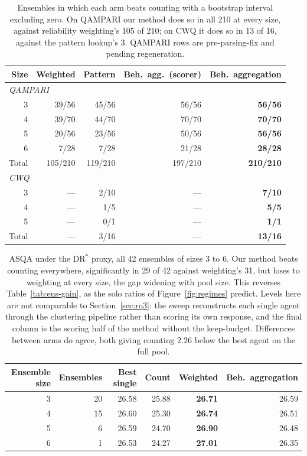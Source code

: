 \documentclass{article}
\begin{document}
\begin{table}[H]
  \caption{Ensembles in which each arm beats counting with a bootstrap interval excluding zero. On QAMPARI our method does so in all 210 at every size, against reliability weighting's 105 of 210; on CWQ it does so in 13 of 16, against the pattern lookup's 3. QAMPARI rows are pre-parsing-fix and pending regeneration.}
  \label{tab:ens-sig}
  \centering
  \begin{tabular}{rrrrr}
    \toprule
    Size & Weighted & Pattern & Beh.\ agg.\ (scorer) & Beh.\ aggregation \\
    \midrule
    \multicolumn{5}{l}{\emph{QAMPARI}} \\
    3 & 39/56 & 45/56 & 56/56 & \textbf{56/56} \\
    4 & 39/70 & 44/70 & 70/70 & \textbf{70/70} \\
    5 & 20/56 & 23/56 & 50/56 & \textbf{56/56} \\
    6 &  7/28 &  7/28 & 21/28 & \textbf{28/28} \\
    \midrule
    Total & 105/210 & 119/210 & 197/210 & \textbf{210/210} \\
    \midrule
    \multicolumn{5}{l}{\emph{CWQ}} \\
    3 & --- & 2/10 & --- & \textbf{7/10} \\
    4 & --- & 1/5  & --- & \textbf{5/5}  \\
    5 & --- & 0/1  & --- & \textbf{1/1}  \\
    \midrule
    Total & --- & 3/16 & --- & \textbf{13/16} \\
    \bottomrule
  \end{tabular}
\end{table}

\begin{table}[H]
  \caption{ASQA under the $\mathrm{DR}^*$ proxy, all 42 ensembles of sizes 3 to 6. Our method beats counting everywhere, significantly in 29 of 42 against weighting's 31, but loses to weighting at every size, the gap widening with pool size. This reverses Table~\ref{tab:ens-gain}, as the solo ratios of Figure~\ref{fig:regimes} predict. Levels here are not comparable to Section~\ref{sec:rq3}: the sweep reconstructs each single agent through the clustering pipeline rather than scoring its own response, and the final column is the scoring half of the method without the keep-budget. Differences between arms do agree, both giving counting $2.26$ below the best agent on the full pool.}
  \label{tab:asqa}
  \centering
  \begin{tabular}{rrrrrr}
    \toprule
    Ensemble size & Ensembles & Best single & Count & Weighted & Beh.\ aggregation \\
    \midrule
    3 & 20 & 26.58 & 25.88 & \textbf{26.71} & 26.59 \\
    4 & 15 & 26.60 & 25.30 & \textbf{26.74} & 26.51 \\
    5 &  6 & 26.59 & 24.70 & \textbf{26.90} & 26.48 \\
    6 &  1 & 26.53 & 24.27 & \textbf{27.01} & 26.35 \\
    \bottomrule
  \end{tabular}
\end{table}
\end{document}
